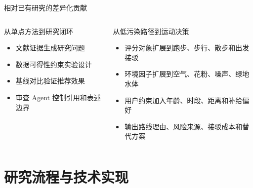 \documentclass[xcolor=table,dvipsnames,svgnames,aspectratio=169]{ctexbeamer}
\newcommand{\smallitem}{\setlength{\itemsep}{0.25em}}
\begin{document}
\begin{frame}{相对已有研究的差异化贡献}
  \small
  \begin{columns}[T]
    \begin{block}{从单点方法到研究闭环}
      \begin{itemize}
        \smallitem
        \item 文献证据生成研究问题
        \item 数据可得性约束实验设计
        \item 基线对比验证推荐效果
        \item 审查 Agent 控制引用和表述边界
      \end{itemize}
    \end{block}

    \begin{block}{从低污染路径到运动决策}
      \begin{itemize}
        \smallitem
        \item 评分对象扩展到跑步、步行、散步和出发接驳
        \item 环境因子扩展到空气、花粉、噪声、绿地水体
        \item 用户约束加入年龄、时段、距离和补给偏好
        \item 输出路线理由、风险来源、接驳成本和替代方案
      \end{itemize}
    \end{block}
  \end{columns}
\end{frame}

\section{研究流程与技术实现}
\end{document}
